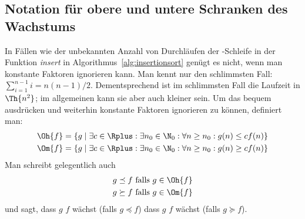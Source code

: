 \Tut\subsection{Notation f\"ur obere und untere Schranken des Wachstums}
\label{subsec:gross-O}

In Fällen wie der unbekannten Anzahl von Durchläufen der
-Schleife in der Funktion \textit{insert} in
Algorithmus~\ref{alg:insertionsort} genügt es nicht, wenn man
konstante Faktoren ignorieren kann. Man kennt nur den schlimmsten
Fall: $\sum_{i=1}^{n-1}i= n(n-1)/2$. Dementsprechend ist im
schlimmsten Fall die Laufzeit in $\Th{n^2}$; im allgemeinen kann sie
aber auch kleiner sein. Um das bequem ausdrücken und weiterhin
konstante Faktoren ignorieren zu können, definiert man:
%
\begin{align*}
\Oh{f} &= \{ g \mid \exists c\in \Rplus:\exists n_0\in\N_0: \forall
n\geq n_0: g(n) \leq c f(n)\}\\
\Om{f} &= \{ g \mid \exists c\in \Rplus:\exists n_0\in\N_0: \forall
n\geq n_0: g(n) \geq c f(n)\} 
\end{align*}
Man schreibt gelegentlich auch
\begin{align*}
  g \preceq f &\text{ falls } g\in\Oh{f} \\
  g \succeq f &\text{ falls } g\in\Om{f} 
\end{align*}
%
und sagt, dass $g$  $f$
wächst (falls $g\preceq f$) \bzw dass $g$  $f$ wächst (falls $g\succeq f$).

